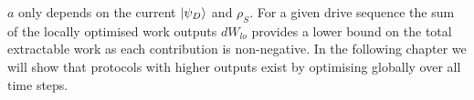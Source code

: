 $a$ only depends on the current $\ket{\psi_D}$ and $\rho_S$.
For a given drive sequence the sum of the locally optimised work outputs $dW_{lo}$ provides a lower bound on the total extractable work as each contribution is non-negative. In the following chapter we will show that protocols with higher outputs exist by optimising globally over all time steps.